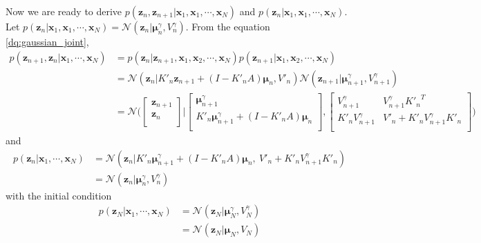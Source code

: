 \documentclass[a4]{article}
\begin{document}
Now we are ready to derive
$p(\bm{z}_n, \bm{z}_{n+1} | \bm{x}_1, \bm{x}_1, \cdots, \bm{x}_N)$ and
$p(\bm{z}_n | \bm{x}_1, \bm{x}_1, \cdots, \bm{x}_N)$.
Let
$p(\bm{z}_n | \bm{x}_1, \bm{x}_1, \cdots, \bm{x}_N) = \mathcal{N}(\bm{z}_n | \bm{\mu}_{n}^{\gamma}, V_n^{\gamma})$.
From the equation \ref{dq:gaussian_joint},
\begin{equation}
\begin{aligned}
p(\bm{z}_{n+1}, \bm{z}_n | \bm{x}_1, \cdots, \bm{x}_N)
&= 
p(\bm{z}_{n} |\bm{z}_{n+1} ,\bm{x}_1, \bm{x}_2, \cdots, \bm{x}_N)
p(\bm{z}_{n+1} |\bm{x}_1, \bm{x}_2, \cdots, \bm{x}_N)\\
&= 
\mathcal{N}(\bm{z}_n|K'_n\bm{z}_{n+1} + (I - K'_nA)\bm{\mu}_n, V'_n)
\mathcal{N}(\bm{z}_{n+1} | \bm{\mu}_{n+1}^{\gamma}, V_{n+1}^{\gamma})\\
&= \mathcal{N}\Big(
\begin{bmatrix}
\bm{z}_{n+1}\\
\bm{z}_{n}\\
\end{bmatrix}
\Big|
\begin{bmatrix}
\bm{\mu}^{\gamma}_{n+1}\\
K'_n\bm{\mu}^{\gamma}_{n+1} + (I - K'_nA)\bm{\mu}_n\\
\end{bmatrix}
,
\begin{bmatrix}
V^{\gamma}_{n+1} & V^{\gamma}_{n+1}{K'_n}^T\\
K'_nV^{\gamma}_{n+1} & V'_n + K'_nV^{\gamma}_{n+1}K'_n\\
\end{bmatrix}
\Big)
\end{aligned}
\end{equation}
and
\begin{equation}
\begin{aligned}
p(\bm{z}_n | \bm{x}_1, \cdots, \bm{x}_N) &= 
\mathcal{N}\left(\bm{z}_n | 
K'_n\bm{\mu}^{\gamma}_{n+1} + (I - K'_nA)\bm{\mu}_n,\:
V'_n + K'_nV^{\gamma}_{n+1}K'_n
\right)\\
&=
\mathcal{N}\left(\bm{z}_n | \bm{\mu}^{\gamma}_{n}, V^{\gamma}_{n}\right)
\end{aligned}
\end{equation}
with the initial condition
\begin{equation}
\begin{aligned}
p(\bm{z}_N | \bm{x}_1, \cdots, \bm{x}_N)
&= 
\mathcal{N}\left(\bm{z}_N | \bm{\mu}^{\gamma}_{N}, V^{\gamma}_{N}\right)\\
&=
\mathcal{N}\left(\bm{z}_N | \bm{\mu}_{N}, V_{N}\right)
\end{aligned}
\end{equation}
\end{document}
